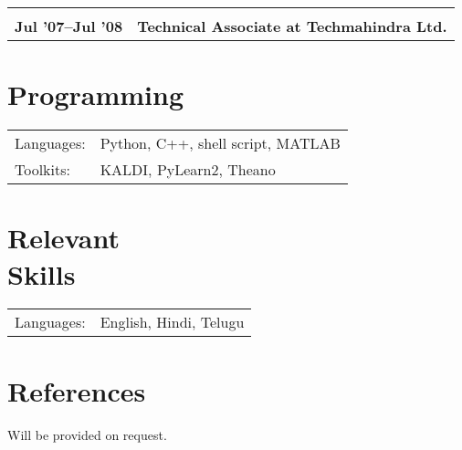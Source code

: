 \documentclass[margin,line,pifont,palatino,courier]{res}
\begin{document}
\begin{resume}
\begin{longtable}{@{}p{1.2in}p{3.8in}}
&\\
\textbf{Jul '07--Jul '08} & \textbf{Technical Associate at Techmahindra Ltd.} \\
\end{longtable}

\section{\sc Programming}

\begin{tabular}{@{}p{0.8in}p{6in}}

Languages:& Python, C++, shell script, MATLAB\\
Toolkits: & KALDI, PyLearn2, Theano \\

\end{tabular}

\section{\sc Relevant \\ Skills}

\begin{tabular}{@{}p{0.8in}p{6in}}

Languages:& English, Hindi, Telugu\\

\end{tabular}




\section{\sc References}

Will be provided on request.

\end{resume}
\end{document}
